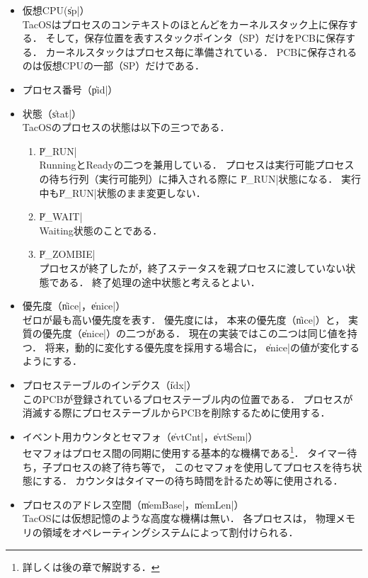 \begin{itemize}
\item 仮想CPU(\|sp|） \\
  TacOSはプロセスのコンテキストのほとんどをカーネルスタック上に保存する．
  そして，保存位置を表すスタックポインタ（SP）だけをPCBに保存する．
  カーネルスタックはプロセス毎に準備されている．
  PCBに保存されるのは仮想CPUの一部（SP）だけである．
\item プロセス番号（\|pid|）
\item 状態（\|stat|） \\
  TacOSのプロセスの状態は以下の三つである．
  \begin{enumerate}
  \item \|P_RUN| \\
    RunningとReadyの二つを兼用している．
    プロセスは実行可能プロセスの待ち行列（実行可能列）に挿入される際に
    \|P_RUN|状態になる．
    実行中も\|P_RUN|状態のまま変更しない．
  \item \|P_WAIT| \\
    Waiting状態のことである．
  \item \|P_ZOMBIE| \\
    プロセスが終了したが，終了ステータスを親プロセスに渡していない状態である．
    終了処理の途中状態と考えるとよい．
  \end{enumerate}
\item 優先度（\|nice|，\|enice|） \\
  ゼロが最も高い優先度を表す．
  優先度には，
  本来の優先度（\|nice|）と，
  実質の優先度（\|enice|）の二つがある．
  現在の実装ではこの二つは同じ値を持つ．
  将来，動的に変化する優先度を採用する場合に，
  \|enice|の値が変化するようにする．
\item プロセステーブルのインデクス（\|idx|） \\
  このPCBが登録されているプロセステーブル内の位置である．
  プロセスが消滅する際にプロセステーブルからPCBを削除するために使用する．
\item イベント用カウンタとセマフォ（\|evtCnt|，\|evtSem|） \\
  セマフォはプロセス間の同期に使用する基本的な機構である\footnote{
    詳しくは後の章で解説する．}．
  タイマー待ち，子プロセスの終了待ち等で，
  このセマフォを使用してプロセスを待ち状態にする．
  カウンタはタイマーの待ち時間を計るため等に使用される．
\item プロセスのアドレス空間（\|memBase|，\|memLen|） \\
  TacOSには仮想記憶のような高度な機構は無い．
  各プロセスは，
  物理メモリの領域をオペレーティングシステムによって割付けられる．

\end{itemize}
